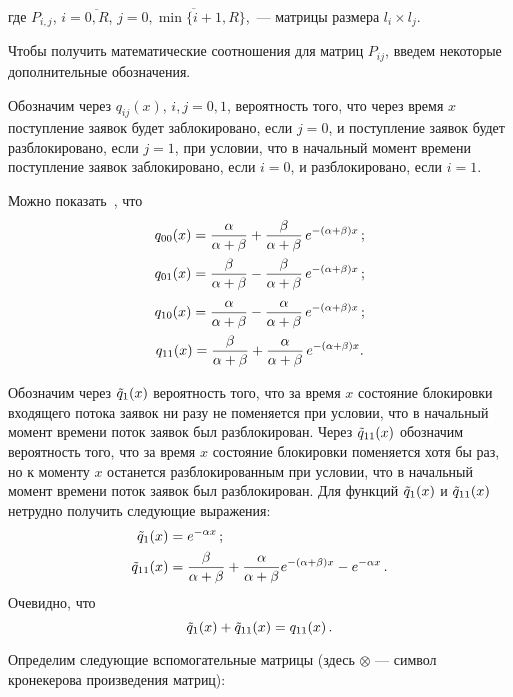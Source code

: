 \begin{multicols}{2}

\noindent
где $P_{i,j}$, $i=\overline{0,R}$, $j=\overline{0,\min\{i+1,R\}}$,~--- матрицы размера $l_i\times l_j$.

Чтобы получить математические соотношения для матриц $P_{ij}$, введем некоторые дополнительные обозначения.

Обозначим через $q_{ij}(x)$,  $i, j=0,1$, вероятность того,
что через время $x$ поступление заявок будет заблокировано, если $j=0$,
и поступление заявок будет разблокировано,
если $j=1$, при условии, что в начальный момент времени поступление заявок
заблокировано, если $i=0$, и разблокировано, если $i=1$.

Можно показать~\cite{C08}, что
\begin{gather*}
q_{00}(x)=\displaystyle\frac{\displaystyle \alpha\mathstrut}{\displaystyle \alpha+\beta\mathstrut}+\displaystyle\frac{\displaystyle \beta\mathstrut}{\displaystyle \alpha+\beta\mathstrut}\,
e^{-(\alpha+\beta)x}\,;\\
q_{01}(x)=\displaystyle\frac{\displaystyle \beta\mathstrut}{\displaystyle \alpha+\beta\mathstrut}-\displaystyle\frac{\displaystyle \beta\mathstrut}{\displaystyle \alpha+\beta\mathstrut}\,e^{-(\alpha+\beta)x}\,;\\
q_{10}(x)=\displaystyle\frac{\displaystyle \alpha\mathstrut}{\displaystyle \alpha+\beta\mathstrut}-\displaystyle\frac{\displaystyle \alpha\mathstrut}{\displaystyle \alpha+\beta\mathstrut}\,e^{-(\alpha+\beta)x}\,;\\
q_{11}(x)=\displaystyle\frac{\displaystyle \beta\mathstrut}{\displaystyle \alpha+\beta\mathstrut}+\displaystyle\frac{\displaystyle \alpha\mathstrut}{\displaystyle \alpha+\beta\mathstrut}\,e^{-(\alpha+\beta)x}.
\end{gather*}

Обозначим через $\Tilde q_1(x)$ вероятность того,
что за время $x$ состояние блокировки входящего потока заявок ни разу не поменяется при условии,
что в начальный момент времени поток заявок был разблокирован.
Через $\Tilde q_{11}(x)$ обозначим вероятность того,
что за время $x$ состояние блокировки поменяется хотя бы раз,
но к моменту $x$ останется разблокированным при условии,
что в начальный момент времени поток заявок был разблокирован.
Для функций $\Tilde q_1(x)$ и $\Tilde q_{11}(x)$ нетрудно получить следующие выражения:
\begin{align*}
\Tilde q_1(x)&=e^{-\alpha x}\,;\\
\Tilde q_{11}(x)&=\displaystyle\frac{\displaystyle \beta\mathstrut}{\displaystyle \alpha + \beta\mathstrut} +\displaystyle\frac{\displaystyle \alpha\mathstrut}{\displaystyle  \alpha +\beta\mathstrut}e^{-(\alpha+\beta)x} - e^{-\alpha x}\,.
\end{align*}
Очевидно, что
$$
\Tilde q_1(x)+ \Tilde q_{11}(x)= q_{11}(x)\,.
$$

Определим следующие вспомогательные матрицы (здесь $\otimes$ --- символ кронекерова произведения матриц):


\end{multicols}

